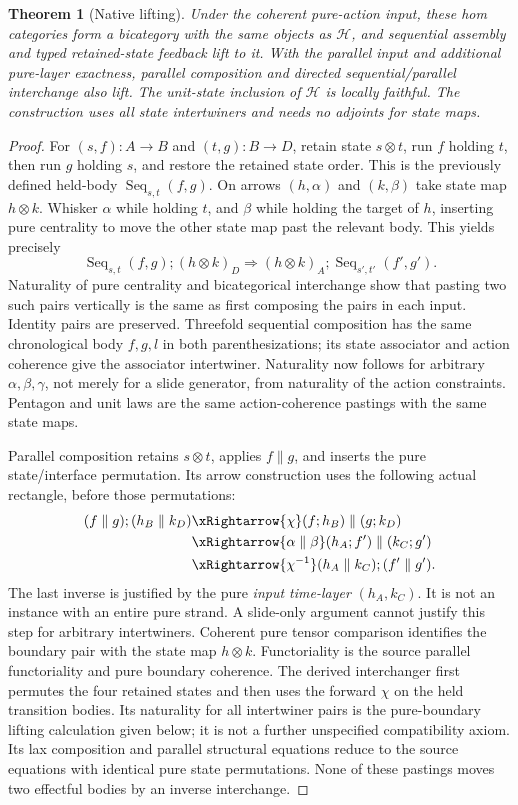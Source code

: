 \documentclass{article}
\newtheorem{theorem}{Theorem}\newtheorem{proposition}{Proposition}
\begin{document}
\begin{theorem}[Native lifting]
Under the coherent pure-action input, these hom categories form a bicategory with the same objects as $\mathcal H$, and sequential assembly and typed retained-state feedback lift to it. With the parallel input and additional pure-layer exactness, parallel composition and directed sequential/parallel interchange also lift. The unit-state inclusion of $\mathcal H$ is locally faithful. The construction uses all state intertwiners and needs no adjoints for state maps.
\end{theorem}
\begin{proof}
For $(s,f):A\to B$ and $(t,g):B\to D$, retain state $s\otimes t$, run $f$ holding $t$, then run $g$ holding $s$, and restore the retained state order. This is the previously defined held-body $\operatorname{Seq}_{s,t}(f,g)$. On arrows $(h,\alpha)$ and $(k,\beta)$ take state map $h\otimes k$. Whisker $\alpha$ while holding $t$, and $\beta$ while holding the target of $h$, inserting pure centrality to move the other state map past the relevant body. This yields precisely
\[
\operatorname{Seq}_{s,t}(f,g);(h\otimes k)_D
\Rightarrow(h\otimes k)_A;\operatorname{Seq}_{s',t'}(f',g').
\]
Naturality of pure centrality and bicategorical interchange show that pasting two such pairs vertically is the same as first composing the pairs in each input. Identity pairs are preserved. Threefold sequential composition has the same chronological body $f,g,l$ in both parenthesizations; its state associator and action coherence give the associator intertwiner. Naturality now follows for arbitrary $\alpha,\beta,\gamma$, not merely for a slide generator, from naturality of the action constraints. Pentagon and unit laws are the same action-coherence pastings with the same state maps.

Parallel composition retains $s\otimes t$, applies $f\parallel g$, and inserts the pure state/interface permutation. Its arrow construction uses the following actual rectangle, before those permutations:
\[
\begin{aligned}
(f\parallel g);(h_B\parallel k_D)
&\xRightarrow{\chi}(f;h_B)\parallel(g;k_D)\\
&\xRightarrow{\alpha\parallel\beta}(h_A;f')\parallel(k_C;g')\\
&\xRightarrow{\chi^{-1}}(h_A\parallel k_C);(f'\parallel g').
\end{aligned}
\]
The last inverse is justified by the pure \emph{input time-layer} $(h_A,k_C)$. It is not an instance with an entire pure strand. A slide-only argument cannot justify this step for arbitrary intertwiners. Coherent pure tensor comparison identifies the boundary pair with the state map $h\otimes k$. Functoriality is the source parallel functoriality and pure boundary coherence. The derived interchanger first permutes the four retained states and then uses the forward $\chi$ on the held transition bodies. Its naturality for all intertwiner pairs is the pure-boundary lifting calculation given below; it is not a further unspecified compatibility axiom. Its lax composition and parallel structural equations reduce to the source equations with identical pure state permutations. None of these pastings moves two effectful bodies by an inverse interchange.


\end{proof}
\end{document}
